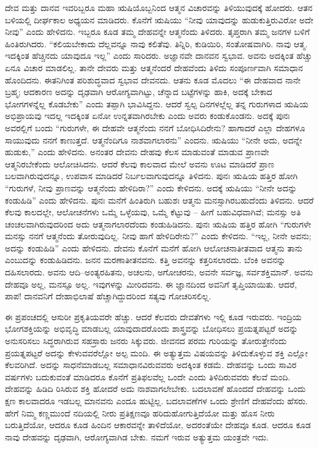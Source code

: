 ದೇವ ಮತ್ತು ದಾನವ ಇವರಿಬ್ಬರೂ ಮಹಾ ಋಷಿಯೊಬ್ಬನಿಂದ ಆತ್ಮನ ವಿಚಾರವನ್ನು ತಿಳಿಯುವುದಕ್ಕೆ ಹೋದರು. ಆತನ ಬಳಿಯಲ್ಲಿ ದೀರ್ಘಕಾಲ ಅಧ್ಯಯನ ಮಾಡಿದರು. ಕೊನೆಗೆ ಋಷಿಯು “ನೀವು ಯಾವುದನ್ನು ಹುಡುಕುತ್ತಿರುವಿರೋ ಅದೇ ನೀವು” ಎಂದು ಹೇಳಿದನು. ಇಬ್ಬರೂ ಕೂಡ ತಮ್ಮ ದೇಹವನ್ನೇ ಆತ್ಮನೆಂದು ತಿಳಿದರು. ತೃಪ್ತರಾಗಿ ತಮ್ಮ ಜನಗಳ ಬಳಿಗೆ ಹಿಂತಿರುಗಿದರು. “ಕಲಿಯಬೇಕಾದು ದೆಲ್ಲವನ್ನೂ ನಾವು ಕಲಿತೆವು. ತಿನ್ನಿರಿ, ಕುಡಿಯಿರಿ, ಸಂತೋಷವಾಗಿರಿ. ನಾವು ಆತ್ಮ. ಇದಕ್ಕಿಂತ ಹೆಚ್ಚಿನದು ಯಾವುದೂ ಇಲ್ಲ” ಎಂದು ಸಾರಿದರು. ಅಜ್ಞಾನವೇ ದಾನವನ ಸ್ವಭಾವ. ಅವನು ಅದಕ್ಕಿಂತ ಹೆಚ್ಚು ಏನೂ ವಿಚಾರ ಮಾಡಲಿಲ್ಲ. ತಾನೇ ದೇವರು ಮತ್ತು ಆತ್ಮನೆಂದರೆ ದೇಹವೆಂದು ತಿಳಿದು ಸಂಪೂರ್ಣವಾಗಿ ಸಮಾಧಾನ ಹೊಂದಿದನು. ಈತನಿಗಿಂತ ಪರಿಶುದ್ಧವಾದ ಸ್ವಭಾವ ದೇವನದು. ಆತನು ಕೂಡ ಮೊದಲು “ಈ ದೇಹವಾದ ನಾನೇ ಬ್ರಹ್ಮ; ಆದಕಾರಣ ಅದನ್ನು ದೃಢವಾಗಿ ಆರೋಗ್ಯವಾಗಿಟ್ಟು, ಚೆನ್ನಾದ ಬಟ್ಟೆಗಳನ್ನು ಹಾಕಿ, ಅದಕ್ಕೆ ಬೇಕಾದ ಭೋಗಗಳನ್ನೆಲ್ಲ ಕೊಡಬೇಕು” ಎಂದು ತಪ್ಪಾಗಿ ಭಾವಿಸಿದ್ದನು. ಆದರೆ ಸ್ವಲ್ಪ ದಿನಗಳಲ್ಲೆಲ್ಲ ತನ್ನ ಗುರುಗಳಾದ ಋಷಿಯ ಅಭಿಪ್ರಾಯವು ಇದಲ್ಲ ಇದಕ್ಕಿಂತ ಏನೋ ಉನ್ನತವಾಗಿರಬೇಕು ಎಂದು ಅವರು ಕಂಡುಕೊಂಡನು. ಅದಕ್ಕೆ ಪುನಃ ಅವರಲ್ಲಿಗೆ ಬಂದು “ಗುರುಗಳೇ, ಈ ದೇಹವೇ ಆತ್ಮನೆಂದು ನನಗೆ ಬೋಧಿಸಿದಿರೇನು? ಹಾಗಾದರೆ ಎಲ್ಲಾ ದೇಹಗಳೂ ಸಾಯುವುದು ನನಗೆ ಕಾಣುತ್ತದೆ. ಆತ್ಮನೆಂದಿಗೂ ನಾಶವಾಗಲಾರನು” ಎಂದನು. ಋಷಿಯು “ನೀನೇ ಅದು, ಅದನ್ನೇ ಹುಡುಕು,” ಎಂದು ಹೇಳಿದನು. ಅನಂತರ ದೇವನು ದೇಹವು ಕೆಲಸ ಮಾಡುವಂತೆ ಮಾಡುವ ಪ್ರಾಣವೇ ಆತ್ಮನಿರಬೇಕೆಂದು ಆಲೋಚಿಸಿದನು. ಆದರೆ ಕೆಲವು ಕಾಲವಾದ ಮೇಲೆ ಅವನು ಊಟ ಮಾಡಿದರೆ ಪ್ರಾಣ ಬಲವಾಗಿರುವುದನ್ನೂ, ಉಪವಾಸ ಮಾಡಿದರೆ ನಿರ್ಬಲವಾಗುವುದನ್ನೂ ತಿಳಿದನು. ಪುನಃ ಋಷಿಯ ಹತ್ತಿರ ಹೋಗಿ “ಗುರುಗಳೆ, ನೀವು ಪ್ರಾಣವನ್ನು ಆತ್ಮನೆಂದು ಹೇಳಿದಿರಾ?” ಎಂದು ಕೇಳಿದನು. ಅದಕ್ಕೆ ಋಷಿಯು “ನೀನೇ ಅದನ್ನು ಕಂಡುಹಿಡಿ” ಎಂದು ಹೇಳಿದನು. ಪುನಃ ಮನೆಗೆ ಹಿಂತಿರುಗಿ ಬಹುಶಃ ಆತ್ಮನು ಮನಸ್ಸಾಗಿರಬಹುದೆಂದು ತಿಳಿದನು. ಆದರೆ ಕೆಲವು ಕಾಲದಲ್ಲೇ, ಆಲೋಚನೆಗಳು ಒಮ್ಮೆ ಒಳ್ಳೆಯವು, ಒಮ್ಮೆ ಕೆಟ್ಟುವು – ಹೀಗೆ ಬಹುವಿಧವಾಗಿವೆ; ಮನಸ್ಸು ಅತಿ ಚಂಚಲವಾಗಿರುವುದರಿಂದ ಅದು ಆತ್ಮನಾಗಲಾರದೆಂದು ಕಂಡುಹಿಡಿದನು. ಪುನಃ ಋಷಿಯ ಹತ್ತಿರ ಹೋಗಿ “ಗುರುಗಳೇ ಮನಸ್ಸು ನನಗೆ ಆತ್ಮನೆಂದು ತೋರುವುದಿಲ್ಲ. ನೀವು ಹಾಗೆ ಹೇಳಿದಿರೇನು?” ಎಂದು ಕೇಳಿದನು. “ಇಲ್ಲ, ನೀನೇ ಅವನು; ಅದನ್ನು ಕಂಡುಹಿಡಿ” ಎಂದು ಹೇಳಿದನು. ದೇವನು ಕೊನೆಗೆ ಮನೆಗೆ ಹೋಗಿ ಆಲೋಚನಾತೀತವಾದ ಆತ್ಮನು ತಾನು ಎಂಬುದನ್ನು ಕಂಡುಹಿಡಿದನು. ಜನನ ಮರಣಾತೀತನವನು. ಕತ್ತಿ ಅವನನ್ನು ಕತ್ತರಿಸಲಾರದು. ಬೆಂಕಿ ಅವನನ್ನು ದಹಿಸಲಾರದು. ಅವನು ಆದಿ–ಅಂತ್ಯರಹಿತನು, ಅಚಲನು, ಅಗೋಚರನು, ಅವನೇ ಸರ್ವಜ್ಞ, ಸರ್ವಶಕ್ತಿಮಾನ್​. ಅವನು ದೇಹವೂ ಅಲ್ಲ, ಮನಸ್ಸೂ ಅಲ್ಲ. ಇವುಗಳನ್ನು ಮೀರಿದವನು. ಈ ಜ್ಞಾನದಿಂದ ಅವನಿಗೆ ತೃಪ್ತಿಯಾಯಿತು. ಆದರೆ, ಪಾಪ! ದಾನವನಿಗೆ ದೇಹಾಭಿಲಾಷೆ ಹೆಚ್ಚಾಗಿದ್ದುದರಿಂದ ಸತ್ಯವು ಗೋಚರಿಸಲಿಲ್ಲ.

\vskip 0.3cm

ಈ ಪ್ರಪಂಚದಲ್ಲಿ ಆಸುರೀ ಪ್ರಕೃತಿಯವರೇ ಹೆಚ್ಚು. ಆದರೆ ಕೆಲವರು ದೇವತೆಗಳು ಇಲ್ಲಿ ಕೂಡ ಇರುವರು. ಇಂದ್ರಿಯ ಭೋಗಶಕ್ತಿಯನ್ನು ಅಭಿವೃದ್ಧಿ ಮಾಡಬಲ್ಲ ಯಾವುದಾದರೊಂದು ಶಾಸ್ತ್ರವನ್ನು ಬೋಧಿಸಲು ಪ್ರಯತ್ನಪಟ್ಟರೆ ಅದನ್ನು ಅನುಸರಿಸಲು ಸಿದ್ಧರಾಗಿರುವ ಸಹಸ್ರಾರು ಜನರು ಸಿಕ್ಕುವರು. ಜೀವನದ ಪರಮ ಗುರಿಯನ್ನು ತೋರುತ್ತೇನೆಂದು ಪ್ರಯತ್ನಪಟ್ಟರೆ ಅದನ್ನು ಕೇಳುವವರೆಲ್ಲೋ ಅಲ್ಪ ಮಂದಿ. ಈ ಅತ್ಯುತ್ತಮ ವಿಷಯವನ್ನು ತಿಳಿದುಕೊಳ್ಳುವ ಶಕ್ತಿ ಎಲ್ಲೋ ಕೆಲವರಿಗಿದೆ. ಅದನ್ನು ಸಾಧನೆಮಾಡಬಲ್ಲ ಸಮಾಧಾನವಿರುವವರು ಅದಕ್ಕಿಂತ ಕಡಮೆ. ದೇಹವನ್ನು ಒಂದು ಸಾವಿರ ವರ್ಷಗಳು ಬದುಕುವಂತೆ ಮಾಡಿದರೂ ಕೊನೆಗೆ ಪ್ರತಿಫಲವೆಲ್ಲ ಒಂದೇ ಎಂದು ತಿಳಿದಿರುವವರು ಕೆಲವೆ ಮಂದಿ. ದೇಹವನ್ನು ಹಿಡಿದಿ ರಿಸಿರುವ ಶಕ್ತಿ ಹೋದರೆ ಅದು ನಾಶವಾಗಲೇಬೇಕು. ಬದಲಾವಣೆ ಹೊಂದದೆ ದೇಹವನ್ನು ಒಂದು ಕ್ಷಣ ಕಾಲವಾದರೂ ಇಡಬಲ್ಲ ಮಾನವನು ಎಂದೂ ಹುಟ್ಟಿಲ್ಲ. ಬದಲಾವಣೆಗಳ ಒಂದು ಶ್ರೇಣಿಗೆ ದೇಹವೆಂದು ಹೆಸರು. ಹೇಗೆ ನಿಮ್ಮ ಕಣ್ಣಮುಂದೆ ನದಿಯಲ್ಲಿ ನೀರು ಪ್ರತಿಕ್ಷಣವೂ ಹರಿದುಹೋಗುತ್ತಿದೆಯೋ ಮತ್ತು ಹೊಸ ನೀರು ಬರುತ್ತಿದೆಯೋ, ಆದರೂ ಕೂಡ ಹಿಂದಿನ ಆಕಾರವನ್ನೇ ತಾಳಿದೆಯೋ, ಅದರಂತೆಯೇ ದೇಹವೂ ಕೂಡ. ಆದರೂ ಕೂಡ ನಾವು ದೇಹವನ್ನು ದೃಢವಾಗಿ, ಆರೋಗ್ಯವಾಗಿಡ ಬೇಕು. ನಮಗೆ ಇರುವ ಅತ್ಯುತ್ತಮ ಯಂತ್ರವೇ ಇದು. 

